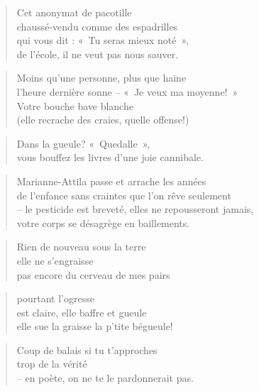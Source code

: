   \begin{verse}
    Cet anonymat de pacotille\\
    chaussé-vendu comme des espadrilles\\
    qui vous dit : «~Tu seras mieux noté~»,\\
    de l’école, il ne veut pas nous sauver.
  \end{verse}
  \begin{verse}
    Moins qu’une personne, plus que haine\\
    l’heure dernière sonne -- «~Je veux ma moyenne!~»\\
    Votre bouche bave blanche\\
    (elle recrache des craies, quelle offense!)
  \end{verse}
  \begin{verse}
    Dans la gueule? «~Quedalle~»,\\
    vous bouffez les livres d’une joie cannibale.
  \end{verse}
  \begin{verse}
    Marianne-Attila passe et arrache les années\\
    de l’enfance sans craintes que l’on rêve seulement\\
    -- le pesticide est breveté, elles ne repousseront jamais,\\
    votre corps se désagrège en baillements.
  \end{verse}
  \begin{verse}
    Rien de nouveau sous la terre\\
    elle ne s’engraisse\\
    pas encore du cerveau de mes pairs
  \end{verse}
  \begin{verse}
    pourtant l’ogresse\\
    est claire, elle baffre et gueule\\
    elle sue la graisse la p’tite bégueule!
  \end{verse}
  \begin{center}
  \end{center}
  \begin{verse}
    Coup de balais si tu t’approches\\
    trop de la vérité\\
    -- en poète, on ne te le pardonnerait pas.
  \end{verse}
